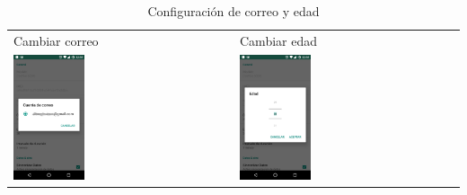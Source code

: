 {\begin{table}[!h]
\begin{tabular}{ll}
\textsf{\relax 
Cambiar correo
} & \textsf{\relax 
Cambiar edad
}\\
    {\includegraphics[width=0.33\textwidth]{anexos/graphics/conf_mail.jpg}}
 & 
    {\includegraphics[width=0.33\textwidth]{anexos/graphics/conf_age.jpg}}
\\
\end{tabular}
    \caption{Configuración de correo y edad}\label{config_adic:emedad}
\end{table}

}
